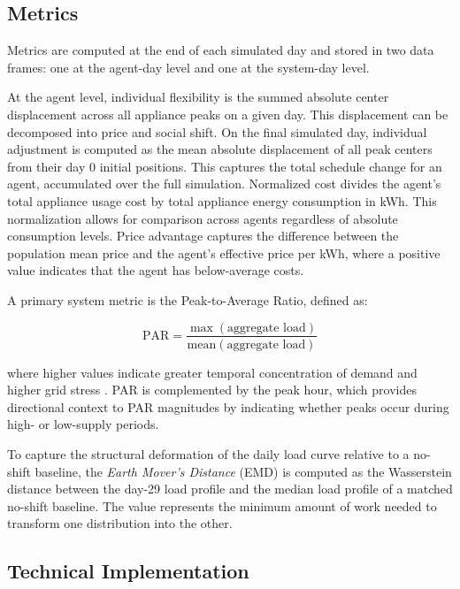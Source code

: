 \documentclass[11pt, a4paper]{article}
\begin{document}
\subsection{Metrics} \label{subs:metrics}

Metrics are computed at the end of each simulated day and stored in two data frames: one at the agent-day level and one at the system-day level.
 
At the agent level, individual flexibility is the summed absolute center displacement across all appliance peaks on a given day. This displacement can be decomposed into price and social shift. On the final simulated day, individual adjustment is computed as the mean absolute displacement of all peak centers from their day 0 initial positions. This captures the total schedule change for an agent, accumulated over the full simulation. Normalized cost divides the agent's total appliance usage cost by total appliance energy consumption in kWh. This normalization allows for comparison across agents regardless of absolute consumption levels. Price advantage captures the difference between the population mean price and the agent's effective price per kWh, where a positive value indicates that the agent has below-average costs.

\noindent A primary system metric is the Peak-to-Average Ratio, defined as:
 
\begin{equation}
\mathrm{PAR} = \frac{\max(\text{aggregate load})}{\text{mean}(\text{aggregate load})}
\label{eq:par}
\end{equation}
 
\noindent where higher values indicate greater temporal concentration of demand and higher grid stress \autocite{makhadmeh_optimization_2019}. PAR is complemented by the peak hour, which provides directional context to PAR magnitudes by indicating whether peaks occur during high- or low-supply periods.
 
To capture the structural deformation of the daily load curve relative to a no-shift baseline, the \textit{Earth Mover's Distance} (EMD) is computed as the Wasserstein distance between the day-29 load profile and the median load profile of a matched no-shift baseline. The value represents the minimum amount of work needed to transform one distribution into the other.

\subsection{Technical Implementation} \label{subs:technical}
\end{document}
